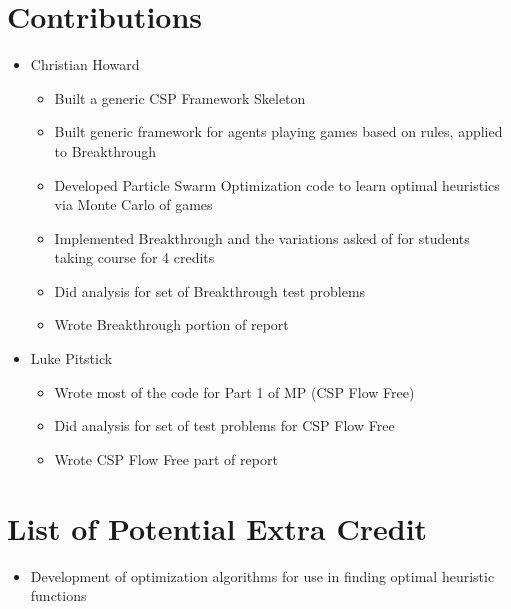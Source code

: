 \documentclass{article}[12pt]
\begin{document}
\newpage
\section{Contributions}
\begin{itemize}
\item Christian Howard
	\begin{itemize}
	\item Built a generic CSP Framework Skeleton
	\item Built generic framework for agents playing games based on rules, applied to Breakthrough
	\item Developed Particle Swarm Optimization code to learn optimal heuristics via Monte Carlo of games
	\item Implemented Breakthrough and the variations asked of for students taking course for 4 credits
	\item Did analysis for set of Breakthrough test problems
	\item Wrote Breakthrough portion of report
	\end{itemize}
\item Luke Pitstick
	\begin{itemize}
	\item Wrote most of the code for Part 1 of MP (CSP Flow Free)
	\item Did analysis for set of test problems for CSP Flow Free
	\item Wrote CSP Flow Free part of report
	\end{itemize}
\end{itemize}   
   
   
\newpage
   \section{List of Potential Extra Credit}
   \begin{itemize}
   \item Development of optimization algorithms for use in finding optimal heuristic functions
\end{itemize}      
   
\end{document}
